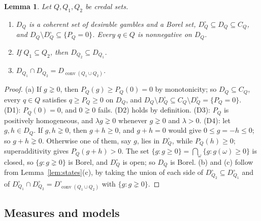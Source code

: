 \documentclass[11pt]{article}
\newtheorem{lemma}[theorem]{Lemma}
\theoremstyle{definition}
\DeclareMathOperator{\conv}{conv}
\begin{document}
\begin{lemma}\label{lem:DQ}
Let $Q,Q_1,Q_2$ be credal sets.
\begin{enumerate}[label=(\alph*)]
\item $D_Q$ is a coherent set of desirable gambles and a Borel set, $D^\circ_Q\subseteq D_Q\subseteq C_Q$, and $D_Q\setminus D^\circ_Q\subseteq\{P_Q=0\}$. Every $q\in Q$ is nonnegative on $D_Q$.
\item If $Q_1\subseteq Q_2$, then $D_{Q_2}\subseteq D_{Q_1}$.
\item $D_{Q_1}\cap D_{Q_2}=D_{\conv(Q_1\cup Q_2)}$.
\end{enumerate}
\end{lemma}
\begin{proof}
(a) If $g\gneq0$, then $P_Q(g)\ge P_Q(0)=0$ by monotonicity; so $D_Q\subseteq C_Q$, every $q\in Q$ satisfies $q\ge P_Q\ge0$ on $D_Q$, and $D_Q\setminus D^\circ_Q\subseteq C_Q\setminus D^\circ_Q=\{P_Q=0\}$. (D1): $P_Q(0)=0$, and $0\gneq0$ fails. (D2) holds by definition. (D3): $P_Q$ is positively homogeneous, and $\lambda g\gneq0$ whenever $g\gneq0$ and $\lambda>0$. (D4): let $g,h\in D_Q$. If $g,h\gneq0$, then $g+h\ge0$, and $g+h=0$ would give $0\le g=-h\le0$; so $g+h\gneq0$. Otherwise one of them, say $g$, lies in $D^\circ_Q$, while $P_Q(h)\ge0$; superadditivity gives $P_Q(g+h)>0$. The set $\{g:g\ge0\}=\bigcap_\omega\{g:g(\omega)\ge0\}$ is closed, so $\{g:g\gneq0\}$ is Borel, and $D^\circ_Q$ is open; so $D_Q$ is Borel.
(b) and (c) follow from Lemma~\ref{lem:states}(c), by taking the union of each side of $D^\circ_{Q_2}\subseteq D^\circ_{Q_1}$ and of $D^\circ_{Q_1}\cap D^\circ_{Q_2}=D^\circ_{\conv(Q_1\cup Q_2)}$ with $\{g:g\gneq0\}$.
\end{proof}

\subsection{Measures and models}
\end{document}
